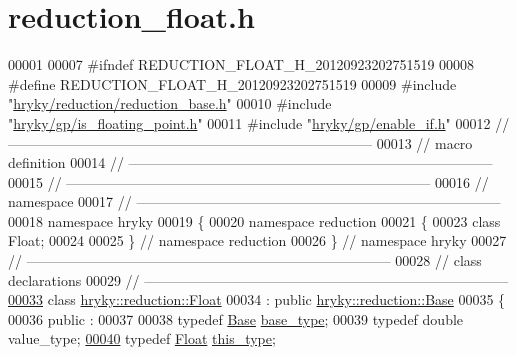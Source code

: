 \hypertarget{reduction__float_8h_source}{\section{reduction\-\_\-float.\-h}
}

\begin{DoxyCode}
00001 
00007 \textcolor{preprocessor}{#ifndef REDUCTION\_FLOAT\_H\_20120923202751519}
00008 \textcolor{preprocessor}{}\textcolor{preprocessor}{#define REDUCTION\_FLOAT\_H\_20120923202751519}
00009 \textcolor{preprocessor}{}\textcolor{preprocessor}{#include "\hyperlink{reduction__base_8h}{hryky/reduction/reduction_base.h}"}
00010 \textcolor{preprocessor}{#include "\hyperlink{is__floating__point_8h}{hryky/gp/is_floating_point.h}"}
00011 \textcolor{preprocessor}{#include "\hyperlink{enable__if_8h}{hryky/gp/enable_if.h}"}
00012 \textcolor{comment}{//
      ------------------------------------------------------------------------------}
00013 \textcolor{comment}{// macro definition}
00014 \textcolor{comment}{//
      ------------------------------------------------------------------------------}
00015 \textcolor{comment}{//
      ------------------------------------------------------------------------------}
00016 \textcolor{comment}{// namespace}
00017 \textcolor{comment}{//
      ------------------------------------------------------------------------------}
00018 \textcolor{keyword}{namespace }hryky
00019 \{
00020 \textcolor{keyword}{namespace }reduction
00021 \{
00023     \textcolor{keyword}{class }Float;
00024 
00025 \} \textcolor{comment}{// namespace reduction}
00026 \} \textcolor{comment}{// namespace hryky}
00027 \textcolor{comment}{//
      ------------------------------------------------------------------------------}
00028 \textcolor{comment}{// class declarations}
00029 \textcolor{comment}{//
      ------------------------------------------------------------------------------}
\hypertarget{reduction__float_8h_source_l00033}{}\hyperlink{classhryky_1_1reduction_1_1_float}{00033} \textcolor{comment}{}\textcolor{keyword}{class }\hyperlink{classhryky_1_1reduction_1_1_float}{hryky::reduction::Float}
00034     : \textcolor{keyword}{public} \hyperlink{classhryky_1_1reduction_1_1_base}{hryky::reduction::Base}
00035 \{
00036 \textcolor{keyword}{public} :
00037 
00038     \textcolor{keyword}{typedef} \hyperlink{classhryky_1_1reduction_1_1_base}{Base}    \hyperlink{classhryky_1_1reduction_1_1_base}{base_type};
00039     \textcolor{keyword}{typedef} \textcolor{keywordtype}{double}  value\_type;
\hypertarget{reduction__float_8h_source_l00040}{}\hyperlink{classhryky_1_1reduction_1_1_float_aad5606baf01147eb8811fe3d0dfd297a}{00040}     \textcolor{keyword}{typedef} \hyperlink{classhryky_1_1reduction_1_1_float}{Float}   \hyperlink{classhryky_1_1reduction_1_1_float_aad5606baf01147eb8811fe3d0dfd297a}{this_type};

\end{DoxyCode}

